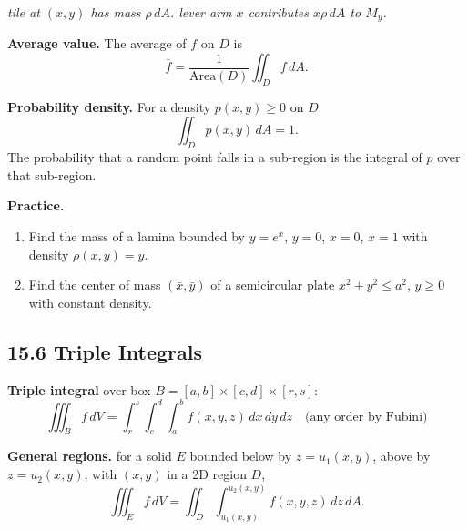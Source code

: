 \documentclass[12pt]{article}
\theoremstyle{compact}
\begin{document}
\begin{center}
\end{center}

\textit{tile at $(x,y)$ has mass $\rho\,dA$. lever arm $x$ contributes $x\rho\,dA$ to $M_y$.}

\textbf{Average value.} The average of $f$ on $D$ is
\[
\bar{f} = \frac{1}{\text{Area}(D)} \iint_D f\,dA.
\]

\textbf{Probability density.} For a density $p(x,y)\ge 0$ on $D$
\[
\iint_D p(x,y)\,dA = 1.
\]
The probability that a random point falls in a sub-region is the integral of $p$ over that sub-region.

\medskip\textbf{Practice.}
\begin{enumerate}[noitemsep]
  \item Find the mass of a lamina bounded by $y=e^x$, $y=0$, $x=0$, $x=1$ with density $\rho(x,y)=y$.
  \item Find the center of mass $(\bar x,\bar y)$ of a semicircular plate $x^2+y^2\le a^2$, $y\ge0$ with constant density.
\end{enumerate}

\subsection{15.6 Triple Integrals}

\textbf{Triple integral} over box $B=[a,b]\times[c,d]\times[r,s]$:
\[
\iiint_B f\,dV = \int_r^s\int_c^d\int_a^b f(x,y,z)\,dx\,dy\,dz \quad \text{(any order by Fubini)}
\]

\textbf{General regions.} for a solid $E$ bounded below by $z=u_1(x,y)$, above by $z=u_2(x,y)$, with $(x,y)$ in a 2D region $D$,
\[
\iiint_E f\,dV = \iint_D \int_{u_1(x,y)}^{u_2(x,y)} f(x,y,z)\,dz\,dA.
\]
\end{document}
